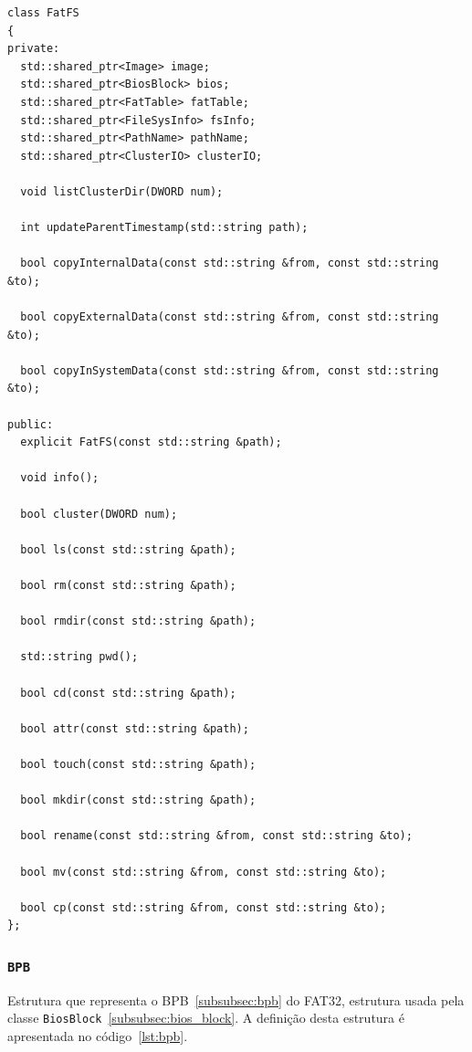 \documentclass[
    12pt,				%
    oneside,   	        %
    a4paper,			%
    english,			%
    french,				%
    spanish,			%
    brazil,				%
    ]{pacotes/abntex2}
\begin{document}
\begin{lstlisting}[caption={Classe para manipulação do sistema de arquivos FAT}, label={lst:fatfs}]
class FatFS
{
private:
  std::shared_ptr<Image> image;
  std::shared_ptr<BiosBlock> bios;
  std::shared_ptr<FatTable> fatTable;
  std::shared_ptr<FileSysInfo> fsInfo;
  std::shared_ptr<PathName> pathName;
  std::shared_ptr<ClusterIO> clusterIO;

  void listClusterDir(DWORD num);
  
  int updateParentTimestamp(std::string path);
  
  bool copyInternalData(const std::string &from, const std::string &to);
  
  bool copyExternalData(const std::string &from, const std::string &to);
  
  bool copyInSystemData(const std::string &from, const std::string &to);

public:
  explicit FatFS(const std::string &path);
  
  void info();
  
  bool cluster(DWORD num);
  
  bool ls(const std::string &path);
  
  bool rm(const std::string &path);
  
  bool rmdir(const std::string &path);
  
  std::string pwd();
  
  bool cd(const std::string &path);
  
  bool attr(const std::string &path);
  
  bool touch(const std::string &path);
  
  bool mkdir(const std::string &path);
  
  bool rename(const std::string &from, const std::string &to);
  
  bool mv(const std::string &from, const std::string &to);
  
  bool cp(const std::string &from, const std::string &to);
};
\end{lstlisting}

\subsubsection{\texttt{BPB}}
\label{subsubsec:bpb_code}

Estrutura que representa o BPB~\ref{subsubsec:bpb} do FAT32, estrutura usada pela classe \texttt{BiosBlock}~\ref{subsubsec:bios_block}. A definição desta estrutura é apresentada no código~\ref{lst:bpb}.
\end{document}
